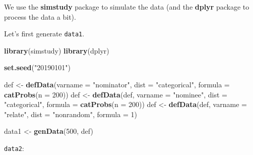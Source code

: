 \documentclass[]{book}
\newenvironment{Shaded}{\begin{snugshade}}{\end{snugshade}}
\newcommand{\KeywordTok}[1]{\textcolor[rgb]{0.13,0.29,0.53}{\textbf{#1}}}
\newcommand{\DataTypeTok}[1]{\textcolor[rgb]{0.13,0.29,0.53}{#1}}
\newcommand{\DecValTok}[1]{\textcolor[rgb]{0.00,0.00,0.81}{#1}}
\newcommand{\StringTok}[1]{\textcolor[rgb]{0.31,0.60,0.02}{#1}}
\newcommand{\CommentTok}[1]{\textcolor[rgb]{0.56,0.35,0.01}{\textit{#1}}}
\newcommand{\OperatorTok}[1]{\textcolor[rgb]{0.81,0.36,0.00}{\textbf{#1}}}
\newcommand{\NormalTok}[1]{#1}
\begin{document}
We use the \textbf{simstudy} package to simulate the data (and the
\textbf{dplyr} package to process the data a bit).

Let's first generate \texttt{data1}.

\begin{Shaded}
\begin{Highlighting}[]
\KeywordTok{library}\NormalTok{(simstudy)}
\KeywordTok{library}\NormalTok{(dplyr)}

\KeywordTok{set.seed}\NormalTok{(}\StringTok{"20190101"}\NormalTok{)}

\NormalTok{def <-}\StringTok{ }\KeywordTok{defData}\NormalTok{(}\DataTypeTok{varname =} \StringTok{"nominator"}\NormalTok{, }\DataTypeTok{dist =} \StringTok{"categorical"}\NormalTok{, }\DataTypeTok{formula =} \KeywordTok{catProbs}\NormalTok{(}\DataTypeTok{n =} \DecValTok{200}\NormalTok{)) }
\NormalTok{def <-}\StringTok{ }\KeywordTok{defData}\NormalTok{(def, }\DataTypeTok{varname =} \StringTok{"nominee"}\NormalTok{, }\DataTypeTok{dist =} \StringTok{"categorical"}\NormalTok{, }\DataTypeTok{formula =} \KeywordTok{catProbs}\NormalTok{(}\DataTypeTok{n =} \DecValTok{200}\NormalTok{))}
\NormalTok{def <-}\StringTok{ }\KeywordTok{defData}\NormalTok{(def, }\DataTypeTok{varname =} \StringTok{"relate"}\NormalTok{, }\DataTypeTok{dist =} \StringTok{"nonrandom"}\NormalTok{, }\DataTypeTok{formula =} \DecValTok{1}\NormalTok{)}

\NormalTok{data1 <-}\StringTok{ }\KeywordTok{genData}\NormalTok{(}\DecValTok{500}\NormalTok{, def)}
\end{Highlighting}
\end{Shaded}

\texttt{data2}:

\begin{Shaded}
\end{Shaded}
\end{document}
